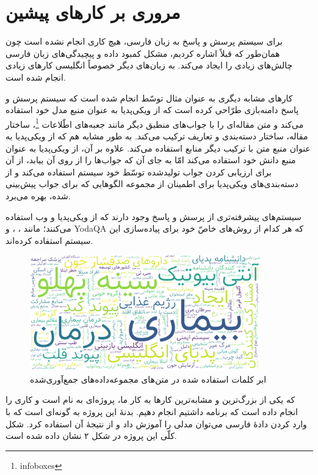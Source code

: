 \documentclass{CCI2020}
\begin{document}
\section{مروری بر کارهای پیشین}
برای سیستم پرسش و پاسخ به زبان فارسی، هیچ کاری انجام نشده است چون همان‌طور که قبلاً اشاره کردیم، مشکل کمبود داده و پیچیدگی‌های زبان فارسی چالش‌های زیادی را ایجاد می‌کند. به زبان‌های دیگر خصوصاً انگلیسی کارهای زیادی انجام شده است.

کارهای مشابه دیگری به عنوان مثال توسّط  \cite{ref3} انجام شده است که سیستم پرسش و پاسخ دامنه‌بازی طرّاحی کرده است که از ویکی‌پدیا به عنوان منبع مدل خود استفاده می‌کند و متن مقاله‌ای را با جواب‌های منطبق دیگر مانند جعبه‌های اطّلاعات \footnote{infoboxes}، ساختار مقاله، ساختار دسته‌بندی و تعاریف ترکیب می‌کند. به طور مشابه  \cite{ref4} هم که از ویکی‌پدیا به عنوان منبع متن با ترکیب دیگر منابع استفاده می‌کند.
علاوه بر آن،  \cite{ref5} از ویکی‌پدیا به عنوان منبع دانش خود استفاده می‌کند امّا به جای آن که جواب‌ها را از روی آن بیابد، از آن برای ارزیابی کردن جواب تولید‌شده توسّط خود سیستم استفاده می‌کند و از دسته‌بندی‌های ویکی‌پدیا برای اطمینان از مجموعه الگوهایی که برای جواب پیش‌بینی‌ شده، بهره می‌برد.

سیستم‌های پیشرفته‌تری از پرسش و پاسخ وجود دارند که از ویکی‌پدیا و وب استفاده می‌کنند؛ مانند ،  \cite{ref6}،   و YodaQA \cite{ref7} که هر کدام از روش‌های خاصّ خود برای پیاده‌سازی این سیستم استفاده کرده‌اند.

\begin{figure}[!htp]
    \centering
    \includegraphics[width=10cm]{images/wordcloud.png}
    \caption{ابر کلمات استفاده شده در متن‌های مجموعه‌داده‌های جمع‌آوری‌شده}
    \label{fig:galaxy}
\end{figure}


که یکی از بزرگ‌ترین و مشابه‌ترین کارها به کار ما، پروژه‌ای به نام \cite{ref1}
است و کاری را انجام داده است که برنامه داشتیم انجام دهیم. بدنهٔ این پروژه به گونه‌ای است که با وارد کردن دادهٔ فارسی می‌توان مدلی را آموزش داد و از نتیجهٔ آن استفاده کرد. شکل کلّی این پروژه در شکل ۲ نشان داده شده است.
\end{document}

